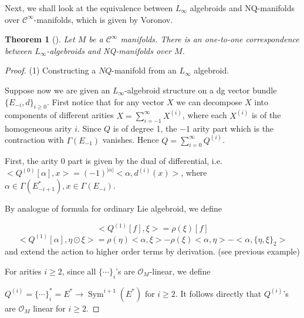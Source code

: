 \documentclass[12pt]{amsart}
\newtheorem{theorem}{Theorem}[section]
\theoremstyle{definition}
\theoremstyle{remark}
\numberwithin{equation}{section}
\newcommand{\cinf}{{\mathcal C}^{\infty}}
\newcommand{\1}{{\mathbb{1}}}
\newcommand{\sym}{\operatorname{Sym}}
\begin{document}
Next, we shall look at the equivalence between $L_{\infty}$ algebroids  and NQ-manifolds over $\cinf$-manifolds, which is given by Voronov\cite{Vor10}.
\begin{theorem}[\cite{Vor10}]
    Let $M$ be a $\cinf$ manifolds. There is an one-to-one correspondence between $L_{\infty}$-algebroids and NQ-manifolds over $M$.
\end{theorem}
\begin{proof}
(1) Constructing a $NQ$-manifold  from an $L_{\infty}$ algebroid.

Suppose now we are given an $L_{\infty}$-algebroid structure on a dg vector bundle $\{E_{-i}, d\}_{i\ge 0}$. First notice that for any vector $X$ we can decompose $X$ into components of different arities $X=\sum_{i= -1}^{\infty}X^{(i)}$, where each $X^{(i)}$ is of the  homogeneous arity $i$. Since $Q$ is of degree 1, the $-1$ arity part which is the contraction with $\Gamma(E_{-1})$ vanishes. Hence $Q=\sum_{i= 0}^{\infty}Q^{(i)}$. 

First, the arity 0 part is given by the dual of differential, i.e. $<Q^{(0)}[\alpha],x>=(-1)^{|\alpha|}< \alpha, d^{(i)}(x)>$, where $\alpha \in \Gamma(E^*_{-i+1}), x\in \Gamma (E_{-i})$.

By analogue of formula for ordinary Lie algebroid, we define

\begin{equation*}
	<Q^{(1)}[f],\xi>=\rho(\xi) [f]
\end{equation*}
\begin{equation*}
	<Q^{(1)}[\alpha], \eta\odot \xi>= \rho(\eta)<\alpha, \xi>- \rho(\xi)<\alpha, \eta>-<\alpha, \{ \eta, \xi\}_2>
\end{equation*}
and extend the action to higher order terms by derivation. (see previous example) 

For arities $i\ge 2$, since all $\{\cdots \}_i$'s are $\mathcal{O}_M$-linear, we define

$Q^{(i)}=\{\cdots \}_i^*= E^* \to \sym^{i+1} (E^*)$ for $i\ge 2$. It follows directly that 
$Q^{(i)}$'s are $\mathcal{O}_M$ linear for $i\ge 2$.


\end{proof}
\end{document}
